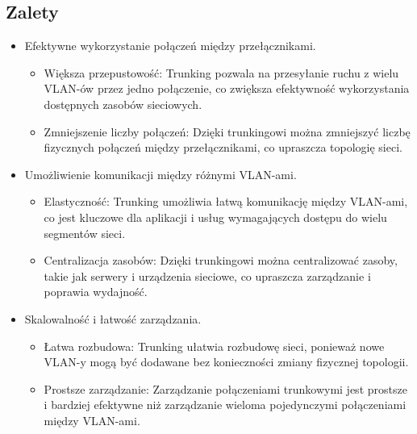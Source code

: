 \subsection{Zalety}
\begin{itemize}
    \item Efektywne wykorzystanie połączeń między przełącznikami.
    \begin{itemize}
        \item Większa przepustowość: Trunking pozwala na przesyłanie ruchu z wielu VLAN-ów przez jedno połączenie, co zwiększa efektywność wykorzystania dostępnych zasobów sieciowych.
        \item Zmniejszenie liczby połączeń: Dzięki trunkingowi można zmniejszyć liczbę fizycznych połączeń między przełącznikami, co upraszcza topologię sieci.
    \end{itemize}
    \item Umożliwienie komunikacji między różnymi VLAN-ami.
    \begin{itemize}
        \item Elastyczność: Trunking umożliwia łatwą komunikację między VLAN-ami, co jest kluczowe dla aplikacji i usług wymagających dostępu do wielu segmentów sieci.
        \item Centralizacja zasobów: Dzięki trunkingowi można centralizować zasoby, takie jak serwery i urządzenia sieciowe, co upraszcza zarządzanie i poprawia wydajność.
    \end{itemize}
    \item Skalowalność i łatwość zarządzania.
    \begin{itemize}
        \item Łatwa rozbudowa: Trunking ułatwia rozbudowę sieci, ponieważ nowe VLAN-y mogą być dodawane bez konieczności zmiany fizycznej topologii.
        \item Prostsze zarządzanie: Zarządzanie połączeniami trunkowymi jest prostsze i bardziej efektywne niż zarządzanie wieloma pojedynczymi połączeniami między VLAN-ami.
    \end{itemize}
\end{itemize}

